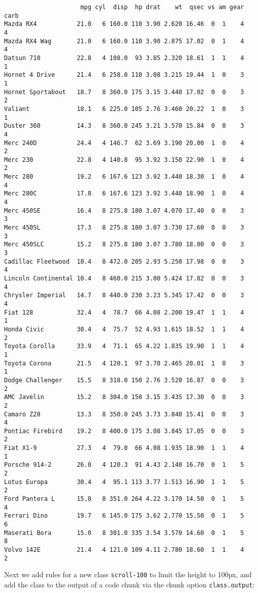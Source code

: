 \documentclass[
  french,
]{article}
\begin{document}
\begin{verbatim}
                     mpg cyl  disp  hp drat    wt  qsec vs am gear carb
Mazda RX4           21.0   6 160.0 110 3.90 2.620 16.46  0  1    4    4
Mazda RX4 Wag       21.0   6 160.0 110 3.90 2.875 17.02  0  1    4    4
Datsun 710          22.8   4 108.0  93 3.85 2.320 18.61  1  1    4    1
Hornet 4 Drive      21.4   6 258.0 110 3.08 3.215 19.44  1  0    3    1
Hornet Sportabout   18.7   8 360.0 175 3.15 3.440 17.02  0  0    3    2
Valiant             18.1   6 225.0 105 2.76 3.460 20.22  1  0    3    1
Duster 360          14.3   8 360.0 245 3.21 3.570 15.84  0  0    3    4
Merc 240D           24.4   4 146.7  62 3.69 3.190 20.00  1  0    4    2
Merc 230            22.8   4 140.8  95 3.92 3.150 22.90  1  0    4    2
Merc 280            19.2   6 167.6 123 3.92 3.440 18.30  1  0    4    4
Merc 280C           17.8   6 167.6 123 3.92 3.440 18.90  1  0    4    4
Merc 450SE          16.4   8 275.8 180 3.07 4.070 17.40  0  0    3    3
Merc 450SL          17.3   8 275.8 180 3.07 3.730 17.60  0  0    3    3
Merc 450SLC         15.2   8 275.8 180 3.07 3.780 18.00  0  0    3    3
Cadillac Fleetwood  10.4   8 472.0 205 2.93 5.250 17.98  0  0    3    4
Lincoln Continental 10.4   8 460.0 215 3.00 5.424 17.82  0  0    3    4
Chrysler Imperial   14.7   8 440.0 230 3.23 5.345 17.42  0  0    3    4
Fiat 128            32.4   4  78.7  66 4.08 2.200 19.47  1  1    4    1
Honda Civic         30.4   4  75.7  52 4.93 1.615 18.52  1  1    4    2
Toyota Corolla      33.9   4  71.1  65 4.22 1.835 19.90  1  1    4    1
Toyota Corona       21.5   4 120.1  97 3.70 2.465 20.01  1  0    3    1
Dodge Challenger    15.5   8 318.0 150 2.76 3.520 16.87  0  0    3    2
AMC Javelin         15.2   8 304.0 150 3.15 3.435 17.30  0  0    3    2
Camaro Z28          13.3   8 350.0 245 3.73 3.840 15.41  0  0    3    4
Pontiac Firebird    19.2   8 400.0 175 3.08 3.845 17.05  0  0    3    2
Fiat X1-9           27.3   4  79.0  66 4.08 1.935 18.90  1  1    4    1
Porsche 914-2       26.0   4 120.3  91 4.43 2.140 16.70  0  1    5    2
Lotus Europa        30.4   4  95.1 113 3.77 1.513 16.90  1  1    5    2
Ford Pantera L      15.8   8 351.0 264 4.22 3.170 14.50  0  1    5    4
Ferrari Dino        19.7   6 145.0 175 3.62 2.770 15.50  0  1    5    6
Maserati Bora       15.0   8 301.0 335 3.54 3.570 14.60  0  1    5    8
Volvo 142E          21.4   4 121.0 109 4.11 2.780 18.60  1  1    4    2
\end{verbatim}

Next we add rules for a new class \texttt{scroll-100} to limit
the height to 100px, and add the class to the output of
a code chunk via the chunk option \texttt{class.output}:
\end{document}
